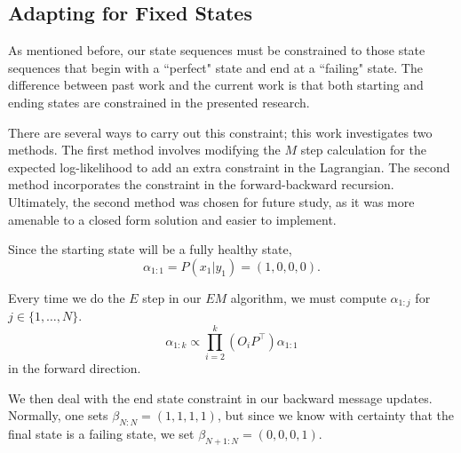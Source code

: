 \documentclass[english]{article}
\numberwithin{equation}{section}
\DeclarePairedDelimiter\paren{(}{)}           %
\begin{document}
%	
%	
%	
%	
	
	\subsection*{Adapting for Fixed States}
	As mentioned before, our state sequences must be constrained to those state sequences that begin with a ``perfect" state and end at a ``failing" state. The difference between past work and the current work is that both starting and ending states are constrained in the presented research.
	
	There are several ways to carry out this constraint; this work investigates two methods. The first method involves modifying the $M$ step calculation for the expected log-likelihood to add an extra constraint in the Lagrangian. The second method incorporates the constraint in the forward-backward recursion. Ultimately, the second method was chosen for future study, as it was more amenable to a closed form solution and easier to implement.
	
	Since the starting state will be a fully healthy state,
	$$\alpha_{1:1}=P(x_1|y_1)=(1,0,0,0).$$
	
	Every time we do the $E$ step in our $EM$ algorithm, we must compute $\alpha_{1:j}$ for $j\in \{1,\ldots,N\}$.
	$$\alpha_{1:k}\propto \prod_{i=2}^k (O_{i}P^{\top})\alpha_{1:1}$$ in the forward direction. 
	
	We then deal with the end state constraint in our backward message updates. Normally, one sets $\beta_{N:N}=(1,1,1,1)$, but since we know with certainty that the final state is a failing state, we set $\beta_{N+1:N}=(0,0,0,1)$.
	
\end{document}
